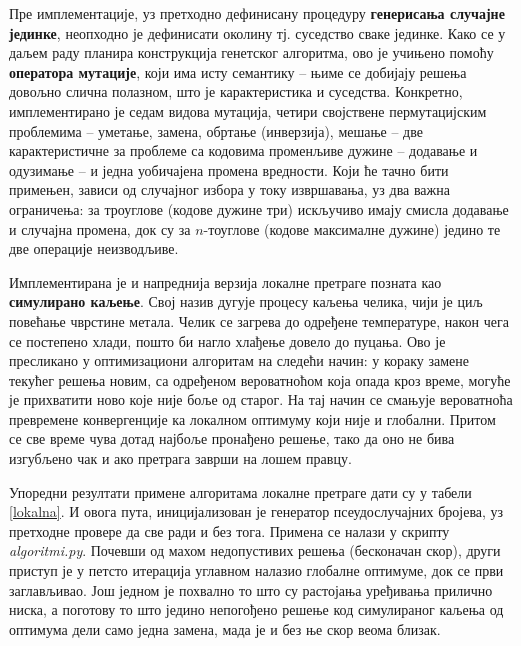 \documentclass[a4paper]{article}
\begin{document}
Пре имплементације, уз претходно дефинисану процедуру \textbf{генерисања случајне јединке}, неопходно је дефинисати околину тј. суседство сваке јединке. Како се у даљем раду планира конструкција генетског алгоритма, ово је учињено помоћу \textbf{оператора мутације}, који има исту семантику -- њиме се добијају решења довољно слична полазном, што је карактеристика и суседства. Конкретно, имплементирано је седам видова мутација, четири својствене пермутацијским проблемима -- уметање, замена, обртање (инверзија), мешање -- две карактеристичне за проблеме са кодовима променљиве дужине -- додавање и одузимање -- и једна уобичајена промена вредности. Који ће тачно бити примењен, зависи од случајног избора у току извршавања, уз два важна ограничења: за троуглове (кодове дужине три) искључиво имају смисла додавање и случајна промена, док су за $n$-тоуглове (кодове максималне дужине) једино те две операције неизводљиве.

Имплементирана је и напреднија верзија локалне претраге позната као \textbf{симулирано каљење}. Свој назив дугује процесу каљења челика, чији је циљ повећање чврстине метала. Челик се загрева до одређене температуре, након чега се постепено хлади, пошто би нагло хлађење довело до пуцања. Ово је пресликано у оптимизациони алгоритам на следећи начин: у кораку замене текућег решења новим, са одређеном вероватноћом која опада кроз време, могуће је прихватити ново које није боље од старог. На тај начин се смањује вероватноћа превремене конвергенције ка локалном оптимуму који није и глобални. Притом се све време чува дотад најбоље пронађено решење, тако да оно не бива изгубљено чак и ако претрага заврши на лошем правцу.

Упоредни резултати примене алгоритама локалне претраге дати су у табели \ref{lokalna}. И овога пута, иницијализован је генератор псеудослучајних бројева, уз претходне провере да све ради и без тога. Примена се налази у скрипту \textit{algoritmi.py}. Почевши од махом недопустивих решења (бесконачан скор), други приступ је у петсто итерација углавном налазио глобалне оптимуме, док се први заглављивао. Још једном је похвално то што су растојања уређивања прилично ниска, а поготову то што једино непогођено решење код симулираног каљења од оптимума дели само једна замена, мада је и без ње скор веома близак.
\end{document}
